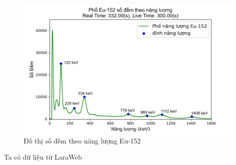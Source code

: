 \documentclass[12pt]{article}
\begin{document}
\begin{figure}[!h]
	\includegraphics[width=\textwidth]{Peak-Eu-152-Plot_cn}
	\caption{Đồ thị số đếm theo năng lượng Eu-152}
\end{figure}

\newpage

Ta có dữ liệu từ LaraWeb
\end{document}
